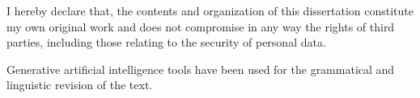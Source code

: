 
\begin{declaration}

I hereby declare that, the contents and organization of this dissertation constitute my own original work and does not compromise in any way the rights of third parties, including those relating to the security of personal data.

Generative artificial intelligence tools have been used for the grammatical
and linguistic revision of the text.


\end{declaration}

